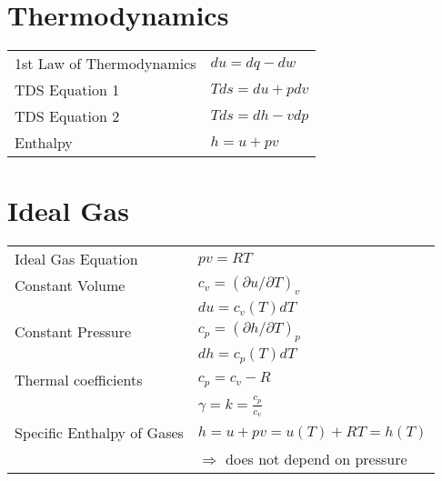 




\begin{multicols*}{2}

\section*{Thermodynamics}
\begin{tabular}{l l}
    1st Law of Thermodynamics & $du = dq - dw$  \\
    TDS Equation 1 & $Tds = du + pdv$ \\
    TDS Equation 2 & $Tds = dh - vdp$ \\
    Enthalpy & $h = u + pv$
\end{tabular}

\section*{Ideal Gas}
\begin{tabular}{l l}
    Ideal Gas Equation & $pv = RT$ \\
    Constant Volume & $c_v = (\partial u / \partial T)_v$ \\
     & $du = c_v (T) dT$ \\
     Constant Pressure & $c_p = (\partial h / \partial T)_p$ \\
     & $dh = c_p (T) dT$ \\
     Thermal coefficients & $c_p = c_v - R$ \\
      & $\gamma = k = \frac{c_p}{c_v}$ \\
      Specific Enthalpy of Gases & $h = u + pv = u(T) + RT = h(T)$ \\
       & $\Rightarrow$ does not depend on pressure
\end{tabular}

\end{multicols*}
